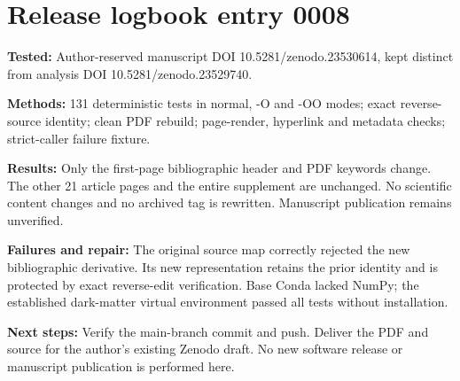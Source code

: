 \section*{Release logbook entry 0008}
\textbf{Tested:} Author-reserved manuscript DOI 10.5281/zenodo.23530614, kept distinct from analysis DOI 10.5281/zenodo.23529740.

\textbf{Methods:} 131 deterministic tests in normal, -O and -OO modes; exact reverse-source identity; clean PDF rebuild; page-render, hyperlink and metadata checks; strict-caller failure fixture.

\textbf{Results:} Only the first-page bibliographic header and PDF keywords change. The other 21 article pages and the entire supplement are unchanged. No scientific content changes and no archived tag is rewritten. Manuscript publication remains unverified.

\textbf{Failures and repair:} The original source map correctly rejected the new bibliographic derivative. Its new representation retains the prior identity and is protected by exact reverse-edit verification. Base Conda lacked NumPy; the established dark-matter virtual environment passed all tests without installation.

\textbf{Next steps:} Verify the main-branch commit and push. Deliver the PDF and source for the author's existing Zenodo draft. No new software release or manuscript publication is performed here.
